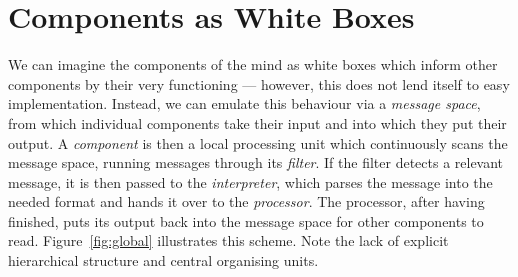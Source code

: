 \section{Components as White Boxes}\label{sec:whiteBoxModel2}

We can imagine the components of the mind as white boxes which inform other components by their very functioning --- however, this does not lend itself to easy implementation. Instead, we can emulate this behaviour via a \emph{message space}, from which individual components take their input and into which they put their output. A \emph{component} is then a local processing unit which continuously scans the message space, running messages through its \emph{filter}. If the filter detects a relevant message, it is then passed to the \emph{interpreter}, which parses the message into the needed format and hands it over to the \emph{processor}. The processor, after having finished, puts its output back into the message space for other components to read. Figure~\ref{fig:global} illustrates this scheme. Note the lack of explicit hierarchical structure and central organising units.

